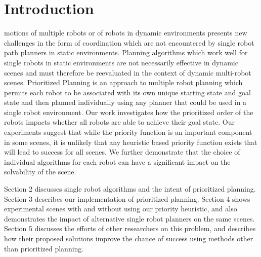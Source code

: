 \documentclass[12pt,journal,compsoc]{IEEEtran}
\begin{document}
\section{Introduction}
 motions of multiple robots or of robots in dynamic environments presents new challenges in the form of coordination which are not encountered by single robot path planners in static environments. Planning algorithms which work well for single robots in static environments are not necessarily effective in dynamic scenes and must therefore be reevaluated in the context of dynamic multi-robot scenes. Prioritized Planning is an approach to multiple robot planning which permits each robot to be associated with its own unique starting state and goal state and then planned individually using any planner that could be used in a single robot environment. Our work investigates how the prioritized order of the robots impacts whether all robots are able to achieve their goal state. Our experiments suggest that while the priority function is an important component in some scenes, it is unlikely that any heuristic based priority function exists that will lead to success for all scenes. We further demonstrate that the choice of individual algorithms for each robot can have a significant impact on the solvability of the scene.
\par
Section 2 discusses single robot algorithms and the intent of prioritized planning. Section 3 describes our implementation of prioritized planning. Section 4 shows experimental scenes with and without using our priority heuristic, and also demonstrates the impact of alternative single robot planners on the same scenes. Section 5 discusses the efforts of other researchers on this problem, and describes how their proposed solutions improve the chance of success using methods other than prioritized planning.

\end{document}
